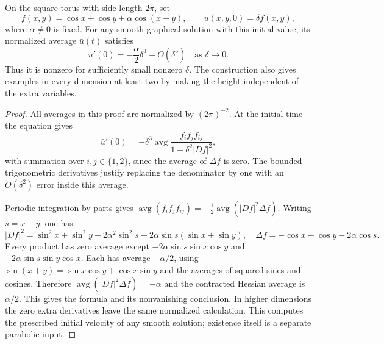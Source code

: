 \begin{example}\label{ex:surface-graph-changing-mean}
On the square torus with side length $2\pi$, set
\[
 f(x,y)=\cos x+\cos y+\alpha\cos(x+y),\qquad
 u(x,y,0)=\delta f(x,y),
\]
where $\alpha\ne0$ is fixed. For any smooth graphical solution with this initial value, its normalized average $\bar u(t)$ satisfies
\[
 \bar u'(0)=-\frac\alpha2\delta^3+O(\delta^5)
 \quad\text{as }\delta\to0.
\]
Thus it is nonzero for sufficiently small nonzero $\delta$. The construction also gives examples in every dimension at least two by making the height independent of the extra variables.
\end{example}
\begin{proof}
All averages in this proof are normalized by $(2\pi)^{-2}$. At the initial time the equation gives
\[
 \bar u'(0)=-\delta^3\operatorname{avg}
 \frac{f_i f_j f_{ij}}{1+\delta^2|Df|^2},
\]
with summation over $i,j\in\{1,2\}$, since the average of $\Delta f$ is zero. The bounded trigonometric derivatives justify replacing the denominator by one with an $O(\delta^2)$ error inside this average.

Periodic integration by parts gives
$\operatorname{avg}(f_i f_j f_{ij})=-\tfrac12\operatorname{avg}(|Df|^2\Delta f)$.
Writing $s=x+y$, one has
\[
 |Df|^2=\sin^2x+\sin^2y+2\alpha^2\sin^2s
       +2\alpha\sin s(\sin x+\sin y),
 \quad \Delta f=-\cos x-\cos y-2\alpha\cos s.
\]
Every product has zero average except
$-2\alpha\sin s\sin x\cos y$ and
$-2\alpha\sin s\sin y\cos x$.
Each has average $-\alpha/2$, using $\sin(x+y)=\sin x\cos y+\cos x\sin y$ and the averages of squared sines and cosines. Therefore $\operatorname{avg}(|Df|^2\Delta f)=-\alpha$ and the contracted Hessian average is $\alpha/2$. This gives the formula and its nonvanishing conclusion. In higher dimensions the zero extra derivatives leave the same normalized calculation. This computes the prescribed initial velocity of any smooth solution; existence itself is a separate parabolic input.
\end{proof}

